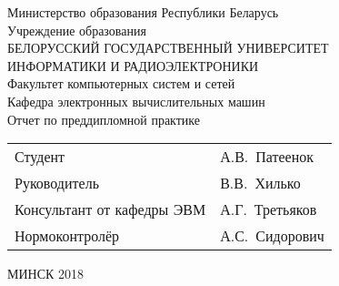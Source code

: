\begin{titlepage}
  \begin{center}
    Министерство образования Республики Беларусь\\[1em]
    Учреждение образования\\
    БЕЛОРУССКИЙ ГОСУДАРСТВЕННЫЙ УНИВЕРСИТЕТ \\
    ИНФОРМАТИКИ И РАДИОЭЛЕКТРОНИКИ\\[1em]

    Факультет компьютерных систем и сетей \\[0.6cm]

    Кафедра электронных вычислительных машин \\[3.0cm]

    {Отчет по преддипломной практике}\\[4.2cm]

    \begin{tabular}{ p{}p{} }
      Студент & А.В.~Патеенок  \\[1em]

      Руководитель & В.В.~Хилько \\[1em]

      Консультант от кафедры ЭВМ & А.Г.~Третьяков\\[1em]

      Нормоконтролёр & А.С.~Сидорович\\
    \end{tabular}

    \vfill
    {\normalsize МИНСК 2018}
  \end{center}
\end{titlepage}

